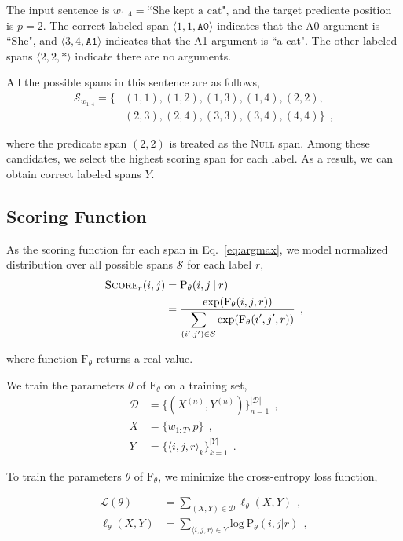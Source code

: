 \documentclass[11pt,a4paper]{article}
\begin{document}
\noindent
The input sentence is $w_{1:4} = \text{``She kept a cat"}$, and the target predicate position is $p=2$.
The correct labeled span $\langle 1, 1, \texttt{A0} \rangle$ indicates that the A0 argument is ``She", and $\langle 3, 4, \texttt{A1} \rangle$ indicates that the A1 argument is ``a cat".
The other labeled spans $\langle 2, 2, * \rangle$ indicate there are no arguments.

All the possible spans in this sentence are as follows,
\begin{align*}
\mathcal{S}_{w_{1:4}} = \{ & (1, 1), (1, 2), (1, 3), (1, 4), (2, 2), \\
& (2, 3), (2, 4), (3, 3), (3, 4), (4, 4) \} \:\: ,
\end{align*}

\noindent
where the predicate span $(2, 2)$ is treated as the \textsc{Null} span.
Among these candidates, we select the highest scoring span for each label.
As a result, we can obtain correct labeled spans $Y$.

\subsection{Scoring Function}
\label{sec:score}
As the scoring function for each span in Eq.~\ref{eq:argmax}, we model normalized distribution over all possible spans $\mathcal{S}$ for each label $r$,
\begin{align}
\label{eq:score}
\textsc{Score}_r(i, j) & = \text{P}_{\theta}(i, j \: | \: r) \nonumber \\
& = \frac{\text{exp}(\text{F}_{\theta}(i, j, r))}{\displaystyle \sum_{(i', j') \in \mathcal{S}} \text{exp}(\text{F}_{\theta}(i', j', r))} \:\:,
\end{align}

\noindent
where function $\text{F}_{\theta}$ returns a real value.

We train the parameters $\theta$ of $\text{F}_{\theta}$ on a training set,
\begin{align*}
\mathcal{D} & = \{ (X^{(n)}, Y^{(n)})\}_{n=1}^{|\mathcal{D}|} \:\:, \\
X & = \{ w_{1:T}, p \} \:\:, \\
Y & = \{ \langle i, j, r \rangle_k \}_{k=1}^{|Y|} \:\:.
\end{align*}

\noindent
To train the parameters $\theta$ of $\text{F}_{\theta}$, we minimize the cross-entropy loss function,

\begin{align}
\label{eq:loss}
\mathcal{L}({\theta}) & = \sum_{(X, Y) \in \mathcal{D}} \ell_{\theta}(X, Y) \:\:, \\ \nonumber
\ell_{\theta}(X, Y) & = \sum_{\langle i, j, r\rangle \in Y} \text{log} \: \text{P}_{\theta}(i, j | r) \:\:,
\end{align}
\end{document}
